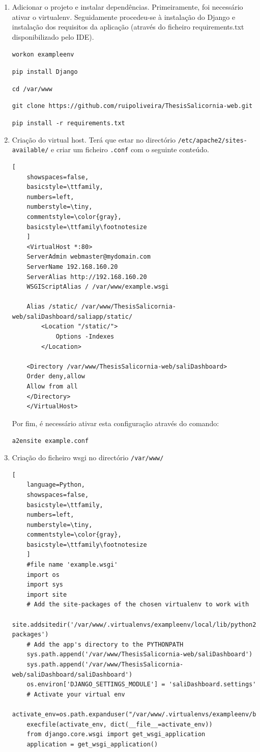 \begin{enumerate}
	\texttt{mkvirtualenv exampleenv --system-site-packages}
	
	
	\item Adicionar o projeto e instalar dependências. Primeiramente, foi necessário ativar o virtualenv. Seguidamente procedeu-se à instalação do Django e instalação dos requisitos da aplicação (através do ficheiro requirements.txt disponibilizado pelo IDE). 
	
	\texttt{workon exampleenv}
	
	\texttt{pip install Django}
	
	\texttt{cd /var/www}
	
	\texttt{git clone https://github.com/ruipoliveira/ThesisSalicornia-web.git}
	
	\texttt{pip install -r requirements.txt}
	

	\item Criação do virtual host. Terá que estar no directório \texttt{/etc/apache2/sites-available/} e criar um ficheiro \texttt{.conf} com o seguinte conteúdo. 
	
	\begin{lstlisting}[
	showspaces=false,
	basicstyle=\ttfamily,
	numbers=left,
	numberstyle=\tiny,
	commentstyle=\color{gray},
	basicstyle=\ttfamily\footnotesize
	]
	<VirtualHost *:80>
	ServerAdmin webmaster@mydomain.com
	ServerName 192.168.160.20
	ServerAlias http://192.168.160.20
	WSGIScriptAlias / /var/www/example.wsgi
	
	Alias /static/ /var/www/ThesisSalicornia-web/saliDashboard/saliapp/static/
		<Location "/static/">
			Options -Indexes
		</Location> 
	
	<Directory /var/www/ThesisSalicornia-web/saliDashboard>
	Order deny,allow    
	Allow from all
	</Directory>
	</VirtualHost>
	\end{lstlisting}
	
	Por fim, é necessário ativar esta configuração através do comando:
	
	\texttt{a2ensite example.conf}
	
	
	\item Criação do ficheiro wsgi no directório \texttt{/var/www/}
	
	\begin{lstlisting}[
	language=Python,
	showspaces=false,
	basicstyle=\ttfamily,
	numbers=left,
	numberstyle=\tiny,
	commentstyle=\color{gray},
	basicstyle=\ttfamily\footnotesize
	]
	#file name 'example.wsgi'
	import os
	import sys
	import site
	# Add the site-packages of the chosen virtualenv to work with
	site.addsitedir('/var/www/.virtualenvs/exampleenv/local/lib/python2.7/site-packages')
	# Add the app's directory to the PYTHONPATH
	sys.path.append('/var/www/ThesisSalicornia-web/saliDashboard')
	sys.path.append('/var/www/ThesisSalicornia-web/saliDashboard/saliDashboard')
	os.environ['DJANGO_SETTINGS_MODULE'] = 'saliDashboard.settings'
	# Activate your virtual env
	activate_env=os.path.expanduser("/var/www/.virtualenvs/exampleenv/bin/activate_this.py")
	execfile(activate_env, dict(__file__=activate_env))
	from django.core.wsgi import get_wsgi_application
	application = get_wsgi_application()\end{lstlisting}
	

\end{enumerate}
